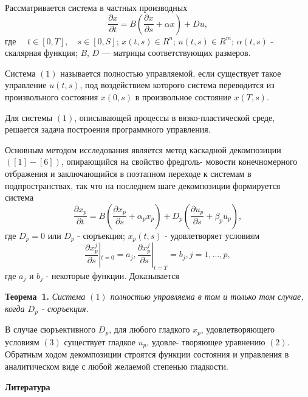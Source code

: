 \vzmscaption

 Рассматривается система в частных производных
\begin{equation}
\frac{\partial x}{\partial t}=B(\frac{\partial x}{\partial s}+ \alpha x) + Du,
\end{equation}
 где $\quad t\in [0,T],\quad s\in [0,S]$; $x(t,s)\in R ^{n}$; $u(t,s)\in R^{m}$; $\alpha(t,s)$ - скалярная функция; $B$, $D$ --- матрицы соответствующих размеров.

Система $(1)$ называется полностью управляемой, если существует такое управление $u(t,s)$,
под воздействием которого система переводится  из произвольного состояния $x(0,s)$ в произвольное состояние $x(T,s)$.

Для системы $(1)$, описывающей процессы в вязко-пластической среде, решается задача построения программного управления.


Основным методом исследования является метод каскадной декомпозиции $([1]-[6])$, опирающийся на свойство фредголь-
мовости конечномерного отбражения и заключающийся в поэтапном переходе к системам в подпространствах, так что на
последнем шаге декомпозиции формируется система
\begin{equation}
\frac{\partial x_{p}}{\partial t}=B(\frac{\partial x_{p}}{\partial s}+ \alpha_{p} x_{p}) + D_{p}(\frac{\partial u_{p}}{\partial s}+ \beta_{p} u_{p}),
\end{equation}
где $D_{p}=0$ или $D_{p}$ - сюръекция; $x_{p}(t,s)$ - удовлетворяет условиям
\begin{equation}
\frac{\partial x^{j}_{p}}{\partial s}|_{t=0} = a_{j}, \frac{\partial x^{j}_{p}}{\partial s}|_{t=T} = b_{j}, j=1,...,p,
\end{equation}
где $a_{j}$ и $b_{j}$ - некоторые функции. Доказывается

\textbf{Теорема~1.} {\it Система $(1)$ полностью управляема в том и только том случае, когда $D_{p}$ - сюръекция.}


В случае сюръективного $D_{p}$, для любого гладкого $x_{p}$, удовлетворяющего
условиям $(3)$ существует гладкое $u_{p}$, удовле-
творяющее уравнению $(2)$. Обратным ходом декомпозиции строятся функции состояния
и управления в аналитическом виде  с любой желаемой степенью гладкости.

\smallskip \centerline {\bf Литература} \nopagebreak


